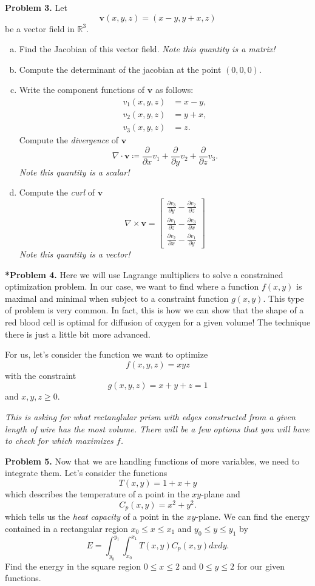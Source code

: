 \documentclass[12pt]{report} %
\newcommand{\R}{\mathbb{R}}
\theoremstyle{definition}
\begin{document}
\noindent\textbf{Problem 3.} Let
\[
\mathbf{v}(x,y,z)= ( x-y,y+x,z)
\]
be a vector field in $\R^3$.  
\begin{enumerate}[(a)]
    \item Find the Jacobian of this vector field. \emph{Note this quantity is a matrix!}
    \item Compute the determinant of the jacobian at the point $(0,0,0)$.  
    \item Write the component functions of $\mathbf{v}$ as follows:
    \begin{align*}
        v_1 (x,y,z) &= x-y,\\
        v_2(x,y,z) &= y+x,\\
        v_3(x,y,z) &= z.
    \end{align*}
    Compute the \emph{divergence} of $\mathbf{v}$
    \[
    \nabla \cdot \mathbf{v} \coloneqq \frac{\partial}{\partial x} v_1 + \frac{\partial}{\partial y} v_2 + \frac{\partial}{\partial z} v_3.
    \]
    \emph{Note this quantity is a scalar!}
    \item Compute the \emph{curl} of $\mathbf{v}$
    \[
    \nabla \times \mathbf{v} = \begin{bmatrix} \frac{\partial v_3}{\partial y} - \frac{\partial v_2}{\partial z} \\ \frac{\partial v_1}{\partial z} - \frac{\partial v_3}{\partial x} \\ \frac{\partial v_2}{\partial x} - \frac{\partial v_1}{\partial y} \end{bmatrix}
    \]
    \emph{Note this quantity is a vector!}
\end{enumerate}
\vspace*{.5cm}



\noindent\textbf{*Problem 4.} Here we will use Lagrange multipliers to solve a constrained optimization problem.  In our case, we want to find where a function $f(x,y)$ is maximal and minimal when subject to a constraint function $g(x,y)$.  This type of problem is very common.  In fact, this is how we can show that the shape of a red blood cell is optimal for diffusion of oxygen for a given volume! The technique there is just a little bit more advanced.

For us, let's consider the function we want to optimize
\[
f(x,y,z)=xyz
\]
with the constraint 
\[
g(x,y,z)=x+y+z=1
\]
and $x,y,z\geq 0$. 

\emph{This is asking for what rectanglular prism with edges constructed from a given length of wire has the most volume. There will be a few options that you will have to check for which maximizes $f$.}
\vspace*{.5cm}

\noindent\textbf{Problem 5.} Now that we are handling functions of more variables, we need to integrate them.  Let's consider the functions
\[
T(x,y) = 1+ x+y
\]
which describes the temperature of a point in the $xy$-plane and
\[
C_p(x,y) = x^2+y^2.
\]
which tells us the \emph{heat capacity} of a point in the $xy$-plane. We can find the energy contained in a rectangular region $x_0\leq x \leq x_1$ and $y_0\leq y \leq y_1$ by
\[
E = \int_{y_0}^{y_1} \int_{x_0}^{x_1} T(x,y)C_p(x,y)dxdy.
\]
Find the energy in the square region $0 \leq x \leq 2$ and $0\leq y \leq 2$ for our given functions.
\end{document}
